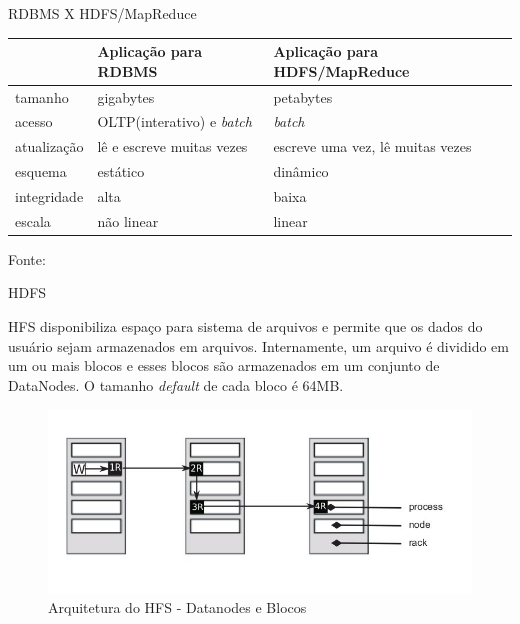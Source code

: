   \begin{frame}{RDBMS X HDFS/MapReduce}
{\small
        \begin{center}
          \begin{tabular}{|p{2cm}||p{3.5cm}||p{3.5cm}|}
            \hline
& Aplicação para RDBMS & Aplicação para HDFS/MapReduce\\ \hline
tamanho & gigabytes & petabytes\\ \hline
acesso & OLTP(interativo) e \emph{batch} & \emph{batch}\\ \hline
atualização & lê e escreve muitas vezes & escreve uma vez, lê muitas vezes\\ \hline
esquema & estático & dinâmico\\ \hline
integridade & alta & baixa\\ \hline
escala & não linear & linear\\ \hline
          \end{tabular}
        \end{center}
}

Fonte: \cite{White:2009}
  \end{frame}

  \begin{frame}{HDFS}

HFS disponibiliza espaço para sistema de arquivos e permite que os dados do usuário sejam armazenados em arquivos. Internamente, um arquivo é dividido em um ou mais blocos e esses blocos são armazenados em um conjunto de DataNodes. O tamanho \emph{default} de cada bloco é 64MB.

    \begin{figure}[hb]
      \centering
      \includegraphics[scale=0.4]{HDFS-arquitetura-replicacao-2.jpg}
      \caption{Arquitetura do HFS - Datanodes e Blocos \cite{Hadoop:2010}}
      \label{fig7:hfs}
    \end{figure} 

  \end{frame}


